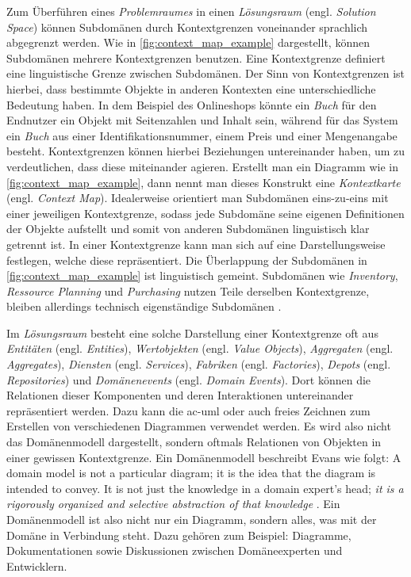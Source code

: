     Zum Überführen eines \emph{Problemraumes} in einen \emph{Lösungsraum} (engl. \emph{Solution Space}) können Subdomänen durch Kontextgrenzen voneinander sprachlich abgegrenzt werden. Wie in \autoref{fig:context_map_example} dargestellt, können Subdomänen mehrere Kontextgrenzen benutzen. Eine Kontextgrenze definiert eine linguistische Grenze zwischen Subdomänen. Der Sinn von Kontextgrenzen ist hierbei, dass bestimmte Objekte in anderen Kontexten eine unterschiedliche Bedeutung haben. In dem Beispiel des Onlineshops könnte ein \emph{Buch} für den Endnutzer ein Objekt mit Seitenzahlen und Inhalt sein, während für das System ein \emph{Buch} aus einer Identifikationsnummer, einem Preis und einer Mengenangabe besteht. Kontextgrenzen können hierbei Beziehungen untereinander haben, um zu verdeutlichen, dass diese miteinander agieren. Erstellt man ein Diagramm wie in \autoref{fig:context_map_example}, dann nennt man dieses Konstrukt eine \emph{Kontextkarte} (engl. \emph{Context Map}). Idealerweise orientiert man Subdomänen eins-zu-eins mit einer jeweiligen Kontextgrenze, sodass jede Subdomäne seine eigenen Definitionen der Objekte aufstellt und somit von anderen Subdomänen linguistisch klar getrennt ist. In einer Kontextgrenze kann man sich auf eine Darstellungsweise festlegen, welche diese repräsentiert. Die Überlappung der Subdomänen in \autoref{fig:context_map_example} ist linguistisch gemeint. Subdomänen wie \emph{Inventory}, \emph{Ressource Planning} und \emph{Purchasing} nutzen Teile derselben Kontextgrenze, bleiben allerdings technisch eigenständige Subdomänen \parencites[S. 335--337]{evans2004domain}[S. 56--57]{vernon2013implementing}.
    
    Im \emph{Lösungsraum} besteht eine solche Darstellung einer Kontextgrenze oft aus \emph{Entitäten} (engl. \emph{Entities}), \emph{Wertobjekten} (engl. \emph{Value Objects}), \emph{Aggregaten} (engl. \emph{Aggregates}), \emph{Diensten} (engl. \emph{Services}), \emph{Fabriken} (engl. \emph{Factories}), \emph{Depots} (engl. \emph{Repositories}) und \emph{Domänenevents} (engl. \emph{Domain Events}). Dort können die Relationen dieser Komponenten und deren Interaktionen untereinander repräsentiert werden. Dazu kann die \gls{ac-uml} oder auch freies Zeichnen zum Erstellen von verschiedenen Diagrammen verwendet werden. Es wird also nicht das Domänenmodell dargestellt, sondern oftmals Relationen von Objekten in einer gewissen Kontextgrenze. Ein Domänenmodell beschreibt Evans wie folgt: \glqq A domain model is not a particular diagram; it is the idea that the diagram is intended to convey. It is not just the knowledge in a domain expert's head; \emph{it is a rigorously organized and selective abstraction of that knowledge}\grqq{} \parencite[S. 3, S. 35--37]{evans2004domain}. Ein Domänenmodell ist also nicht nur ein Diagramm, sondern alles, was mit der Domäne in Verbindung steht. Dazu gehören zum Beispiel: Diagramme, Dokumentationen sowie Diskussionen zwischen Domäneexperten und Entwicklern.
    
